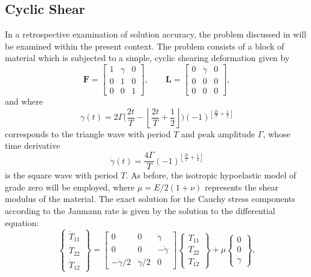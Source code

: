 \subsection{Cyclic Shear}
%
In a retrospective examination of solution accuracy, the problem discussed in \cite{rashid1996} will be examined within the present context. The problem consists of a block of material which is subjected to a simple, cyclic shearing deformation given by
\begin{equation}
    \mathbf{F} = \left[ \begin{array}{ccc} 1 & \gamma & 0 \\ 0 & 1 & 0 \\ 0 & 0 & 1 \end{array} \right], \qquad \mathbf{L} = \left[ \begin{array}{ccc} 0 & \dot{\gamma} & 0 \\ 0 & 0 & 0 \\ 0 & 0 & 0 \end{array} \right],
\end{equation}
and where
\begin{equation}
    \gamma (t) = 2 \Gamma \bigg( \frac{2t}{T} - \left\lfloor \frac{2t}{T} + \frac{1}{2} \right\rfloor \bigg) (-1)^{\left\lfloor \frac{2t}{T} + \frac{1}{2} \right\rfloor}
\end{equation}
corresponds to the triangle wave with period $T$ and peak amplitude $\Gamma$, whose time derivative
\begin{equation}
    \dot{\gamma} (t) = \frac{4 \Gamma}{T} (-1)^{\left\lfloor \frac{2t}{T} + \frac{1}{2} \right\rfloor}
\end{equation}
is the square wave with period $T$. As before, the isotropic hypoelastic model of grade zero will be employed, where $\mu = E/2(1+\nu)$ represents the shear modulus of the material. The exact solution for the Cauchy stress components according to the Jaumann rate is given by the solution to the differential equation:
\begin{equation}
    \left\{ \begin{array}{c} \dot{T}_{11} \\ \dot{T}_{22} \\ \dot{T}_{12} \end{array} \right\} = \left[ \begin{array}{ccc} 0 & 0 & \dot{\gamma} \\ 0 & 0 & - \dot{\gamma} \\ -\dot{\gamma}/2 & \dot{\gamma}/2 & 0 \end{array} \right] \left\{ \begin{array}{c} T_{11} \\ T_{22} \\ T_{12} \end{array} \right\} + \mu \left\{ \begin{array}{c} 0 \\ 0 \\ \dot{\gamma} \end{array} \right\},
\end{equation}
